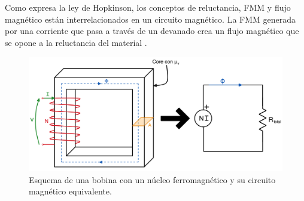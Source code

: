 Como expresa la ley de Hopkinson, los conceptos de reluctancia, FMM y flujo magnético están interrelacionados en un circuito magnético. La FMM generada por una corriente que pasa a través de un devanado crea un flujo magnético que se opone a la reluctancia del material \citep{griffiths2005}\citep{tipler2008}.

    \begin{figure}[H]
        \centering %
        \includegraphics[width=\textwidth]{FigurasMemoria/circuitoMagExplicacion.png}
        \caption{Esquema de una bobina con un núcleo ferromagnético y su circuito magnético equivalente.}
        \label{fig:esquemabasico} %
    \end{figure}